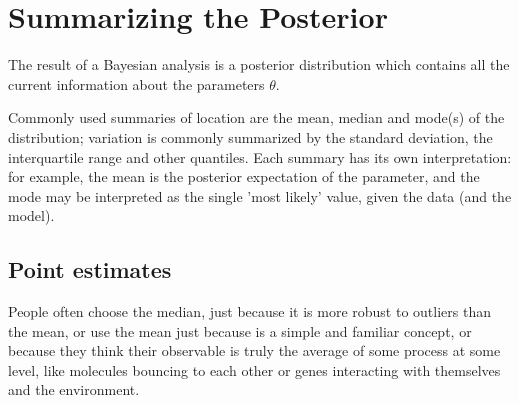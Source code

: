 



\section{Summarizing the Posterior}

The result of a Bayesian analysis is a posterior distribution which contains all the current information about the parameters $\theta$. 


Commonly used summaries of location are the mean, median and mode(s) of the distribution; variation is commonly summarized by the standard deviation, the interquartile range and other quantiles. Each summary has its own interpretation: for example, the mean is the posterior expectation of the parameter, and the mode may be interpreted as the single 'most likely' value, given the data (and the model).


\subsection{Point estimates}

People often choose the median, just because it is more robust to outliers than the mean, or use the mean just because is a simple and familiar concept, or because they think their observable is truly the average of some process at some level, like molecules bouncing to each other or genes interacting with themselves and the environment.

